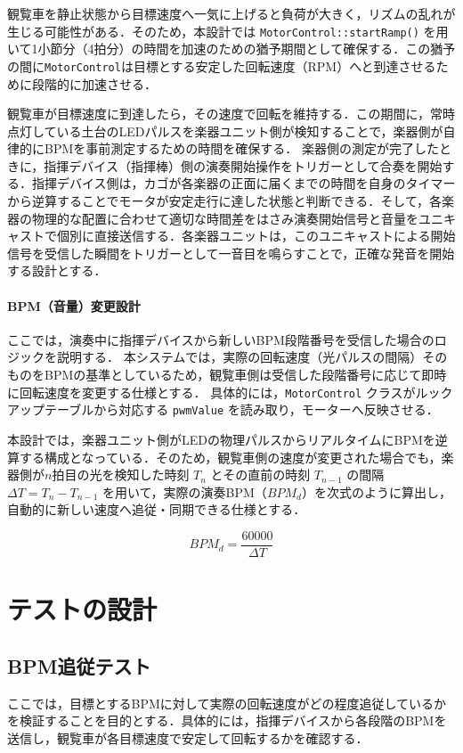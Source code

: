 \documentclass[uplatex,dvipdfmx]{jlreq}
\begin{document}
観覧車を静止状態から目標速度へ一気に上げると負荷が大きく，リズムの乱れが生じる可能性がある．そのため，本設計では \texttt{MotorControl::startRamp()} を用いて1小節分（4拍分）の時間を加速のための猶予期間として確保する．この猶予の間に\texttt{MotorControl}は目標とする安定した回転速度（RPM）へと到達させるために段階的に加速させる．

観覧車が目標速度に到達したら，その速度で回転を維持する．この期間に，常時点灯している土台のLEDパルスを楽器ユニット側が検知することで，楽器側が自律的にBPMを事前測定するための時間を確保する．
楽器側の測定が完了したときに，指揮デバイス（指揮棒）側の演奏開始操作をトリガーとして合奏を開始する．指揮デバイス側は，カゴが各楽器の正面に届くまでの時間を自身のタイマーから逆算することでモータが安定走行に達した状態と判断できる．そして，各楽器の物理的な配置に合わせて適切な時間差をはさみ演奏開始信号と音量をユニキャストで個別に直接送信する．各楽器ユニットは，このユニキャストによる開始信号を受信した瞬間をトリガーとして一音目を鳴らすことで，正確な発音を開始する設計とする．

\paragraph{BPM（音量）変更設計}
ここでは，演奏中に指揮デバイスから新しいBPM段階番号を受信した場合のロジックを説明する．
本システムでは，実際の回転速度（光パルスの間隔）そのものをBPMの基準としているため，観覧車側は受信した段階番号に応じて即時に回転速度を変更する仕様とする．
具体的には，\texttt{MotorControl} クラスがルックアップテーブルから対応する \texttt{pwmValue} を読み取り，モーターへ反映させる．

本設計では，楽器ユニット側がLEDの物理パルスからリアルタイムにBPMを逆算する構成となっている．そのため，観覧車側の速度が変更された場合でも，楽器側が$n$拍目の光を検知した時刻 $T_n$ とその直前の時刻 $T_{n-1}$ の間隔 $\Delta T = T_n - T_{n-1}$ を用いて，実際の演奏BPM（$BPM_d$）を次式のように算出し，自動的に新しい速度へ追従・同期できる仕様とする．

\begin{equation}
\label{eq:bpmdouki}
BPM_d = \frac{60000}{\Delta T}
\end{equation}


\section{テストの設計}

\subsection{BPM追従テスト}
ここでは，目標とするBPMに対して実際の回転速度がどの程度追従しているかを検証することを目的とする．具体的には，指揮デバイスから各段階のBPMを送信し，観覧車が各目標速度で安定して回転するかを確認する．
\end{document}
